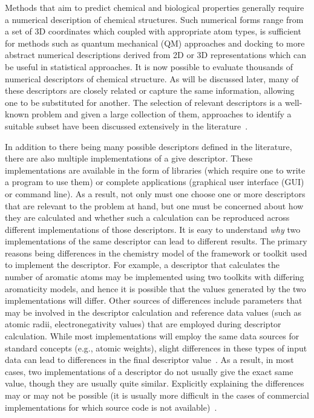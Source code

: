 \documentclass[letterpaper, 12pt]{article}
\begin{document}
Methods that aim to predict chemical and biological properties
generally require a numerical description of chemical structures. Such
numerical forms range from a set of 3D coordinates which coupled with
appropriate atom types, is sufficient for methods such as quantum
mechanical (QM) approaches and docking to more abstract numerical
descriptions derived from 2D or 3D representations which can be useful
in statistical approaches. It is now possible to evaluate thousands of
numerical descriptors of chemical structure. As will be discussed
later, many of these descriptors are closely related or capture the
same information, allowing one to be substituted for another. The
selection of relevant descriptors is a well-known problem and given a
large collection of them, approaches to identify a suitable subset
have been discussed extensively in the
literature~\cite{Miller:2002aa,Kohavi:1997gf}.

In addition to there being many possible descriptors defined in the
literature, there are also multiple implementations of a give
descriptor. These implementations are available in the form of
libraries (which require one to write a program to use them) or
complete applications (graphical user interface (GUI) or command
line). As a result, not only must one choose one or more descriptors
that are relevant to the problem at hand, but one must be concerned
about how they are calculated and whether such a calculation can be
reproduced across different implementations of those descriptors. It
is easy to understand \emph{why} two implementations of the same
descriptor can lead to different results. The primary reasons being
differences in the chemistry model of the framework or toolkit used to
implement the descriptor. For example, a descriptor that calculates
the number of aromatic atoms may be implemented using two toolkits
with differing aromaticity models, and hence it is possible that the
values generated by the two implementations will differ. Other sources
of differences include parameters that may be involved in the
descriptor calculation and reference data values (such as atomic
radii, electronegativity values) that are employed during descriptor
calculation. While most implementations will employ the same data
sources for standard concepts (e.g., atomic weights), slight
differences in these types of input data can lead to differences in
the final descriptor value~\cite{Guha:2006ac}. As a result, in most
cases, two implementations of a descriptor do not usually give the
exact same value, though they are usually quite similar. Explicitly
explaining the differences may or may not be possible (it is usually
more difficult in the cases of commercial implementations for which
source code is not available)~\cite{Spjuth2010}.
\end{document}
